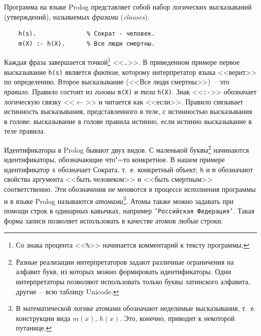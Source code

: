 \documentclass[a4paper,14pt, openany, twoside, draft]{extbook} %
\newcommand{\eeng}[1]{\emph{\foreignlanguage{english}{#1}}}
\begin{document}
Программа на языке Prolog представляет собой набор логических высказываний (утверждений), называемых \emph{фразами} (\eeng{clauses}).

\begin{verbatim}
    h(s).              % Сократ - человек.
    m(X) :- h(X).      % Все люди смертны.
\end{verbatim}

  Каждая фраза завершается точкой\footnote{Со знака процента <<\texttt{\%}>> начинается комментарий к тексту программы.}  <<\texttt{.}>>.  В приведенном примере первое высказывание \texttt{h(s)} является \emph{фактом}, которому интерпретатор языка <<верит>> по определению.  Второе высказывание (<<Все люди смертны>>)~-- это \emph{правило}.  Правило состоит из \emph{головы} \texttt{m(X)} и \emph{тела} \texttt{h(X)}.  Знак <<\texttt{:-}>> обозначает логическую связку <<$\leftarrow$>> и читается как <<если>>.  Правило связывает истинность высказывания, представленного в теле, с истинностью высказывания в голове: высказывание в голове правила истинно, если истинно высказывание в теле правила.


Идентификаторы в Prolog бывают двух видов.  С маленькой буквы\footnote{Разные реализации интерпретаторов задают различные ограничения на алфавит букв, из которых можно формировать идентификаторы.  Одни интерпретаторы позволяют использовать только буквы латинского алфавита, другие~-- всю таблицу Unicode.} начинаются идентификаторы, обозначающие что"=то конкретное.  В нашем примере идентификатор \texttt{s} обозначает Сократа, т.~е. конкретный объект; \texttt{h} и \texttt{m} обозначают свойства аргумента <<быть человеком>> и <<быть смертным>> соответственно.  Эти обозначения не меняются в процессе исполнения программы и в языке Prolog называются \emph{атомами}\footnote{В математической логике атомами обозначают неделимые высказывания, т.~е. конструкции вида $m(x)$, $h(x)$.  Это, конечно, приводит к некоторой путанице.}.  Атомы также можно задавать при помощи строк в одинарных кавычках, например \texttt{'Российская Федерация'}.  Такая форма записи позволяет использовать в качестве атомов любые строки.
\end{document}
